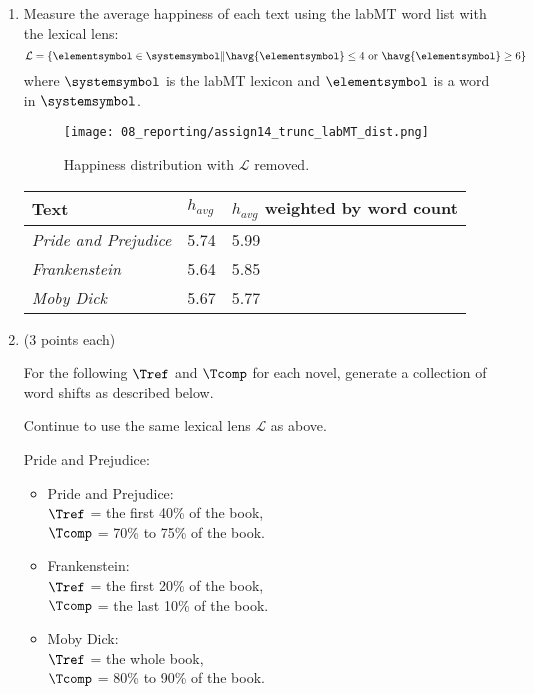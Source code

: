 \begin{enumerate}

\item

  Measure the average happiness of each text
  using the labMT word list
  with the lexical lens:
  \begin{equation}
	\mathcal{L}
    =
    \left\{
    \elementsymbol
    \in
    \systemsymbol
    \|
    \havg{\elementsymbol} \le 4
    \
    \mbox{or}
    \
    \havg{\elementsymbol} \ge 6
    \right\}
    \label{eq:lexicallens}
  \end{equation}
  where
  $\systemsymbol$ is the labMT lexicon
  and
  $\elementsymbol$ is a word in $\systemsymbol$.

\solutionstart

\begin{figure}[H]
	\centering
	\texttt{[image: 08\_reporting/assign14\_trunc\_labMT\_dist.png]}
	\label{fig:happiness_dist}
	\caption{Happiness distribution with $\mathcal{L}$ removed.}
\end{figure}

\begin{tabular}{lll}
	Text & $h_{avg}$ & $ h_{avg}$ weighted by word count \\
	\hline
	\textit{Pride and Prejudice} & 5.74 & 5.99 \\
	\textit{Frankenstein} & 5.64 & 5.85 \\
	\textit{Moby Dick} & 5.67 & 5.77
\end{tabular}

\solutionend

\item (3 points each)

  For the following 
  $\Tref$
  and
  $\Tcomp$
  for each novel,
  generate a collection of word shifts
  as described below.

  Continue to use the same lexical lens $\mathcal{L}$ as above.

  Pride and Prejudice:


  \begin{itemize}
  \item
    Pride and Prejudice:\\
    $\Tref$ = the first 40\% of the book,\\
    $\Tcomp$ = 70\% to 75\% of the book.
  \item 
    Frankenstein:\\
    $\Tref$ =  the first 20\% of the book,\\
    $\Tcomp$ = the last 10\% of the book.
  \item
    Moby Dick:\\
    $\Tref$ =  the whole book,\\
    $\Tcomp$ = 80\% to 90\% of the book.
  \end{itemize}



\end{enumerate}
